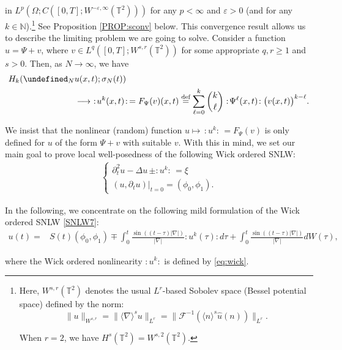 \documentclass[letterpaper, 11pt,  reqno]{amsart}
\newcommand{\1}{\hspace{0.5mm}\text{I}\hspace{0.5mm}}
\newcommand{\noi}{\noindent}
\newcommand{\T}{\mathbb{T}}
\let\P= \undefined
\newcommand{\P}{\mathbf{P}}
\newcommand{\F}{\mathcal{F}}
\newcommand{\nb}{\nabla}
\newcommand{\Dl}{\Delta}
\newcommand{\eps}{\varepsilon}
\newcommand{\ft}{\widehat}
\newcommand{\dt}{\partial_t}
\renewcommand{\l}{\ell}
\renewcommand{\O}{\Omega}
\newcommand{\jb}[1]
{\langle #1 \rangle}
\newcommand{\N}{\mathbb{N}}
\numberwithin{equation}{section}
\numberwithin{theorem}{section}
\begin{document}
\noi
in $L^p(\O; C([0,T];W^{-\eps,\infty}(\T^2)))$
for any $p < \infty$ and $\eps >  0$
(and for any $k \in \N$).\footnote{Here, $W^{s, r}(\T^2)$
denotes the usual $L^r$-based Sobolev space (Bessel potential space) defined by the norm:
\[\| u\|_{W^{s, r}} = \| \jb{\nb}^s u \|_{L^r} = \big\| \F^{-1}( \jb{n}^s \ft u(n))\big\|_{L^r}.\]

\noi
When $r = 2$, we have $H^s(\T^2) = W^{s, 2}(\T^2)$.} 
See Proposition \ref{PROP:sconv} below. 
This convergence result allows us to describe the limiting problem we are going to solve. 
Consider a function $u=\Psi+v$,  where $v\in L^q([0,T];W^{s,r}(\T^2))$ for some appropriate $q,r \ge 1$ and $s >0$. 
Then, as $N \to \infty$, we have
\begin{align}
\label{eq:wick}
H_k(\P_N & u(x, t);  \sigma_N(t))  \notag\\
& \longrightarrow  \ :\!u^k(x, t)\!:\, = F_\Psi(v) (x, t)
\stackrel{\text{def}}{=} \sum_{\ell=0}^k {k\choose \ell} :\! \Psi^\l (x, t)  \!: \big(v(x, t)\big)^{k-\ell}.
\end{align}


\noi
We insist that the  nonlinear (random) function $u \mapsto \, :\!u^k\!:\,  =F_\Psi(v)$ 
is only defined for $u$ of the form $\Psi+v$ with suitable $v$. 
With this in mind,  we set our main goal to prove local well-posedness of 
the following Wick ordered SNLW:
\begin{align}
\begin{cases}
\dt^2 u -  \Dl  u   \, \pm : \!u^{k} \!:\, =  \xi \\
(u, \dt u) |_{t = 0} = (\phi_0, \phi_1). 
\end{cases}
\label{SNLW7}
\end{align}


\noi
In the following, we concentrate on 
the following mild formulation of  the  Wick ordered SNLW \eqref{SNLW7}:
\begin{align}
u(t)= & S(t)(\phi_0,    \phi_1)
 \mp \int_{0}^t  \frac{\sin ((t-\tau)|\nabla|)}{|\nabla|} \!:\! u^k(\tau)\!: \!d\tau 
 + \int_{0}^t \frac{\sin ((t-\tau)|\nabla|)}{|\nabla|}dW(\tau),
\label{SNLW8}
\end{align}

\noi
where the Wick ordered nonlinearity 
$\!:\! u^k\!:$ is defined by \eqref{eq:wick}.


\end{document}
